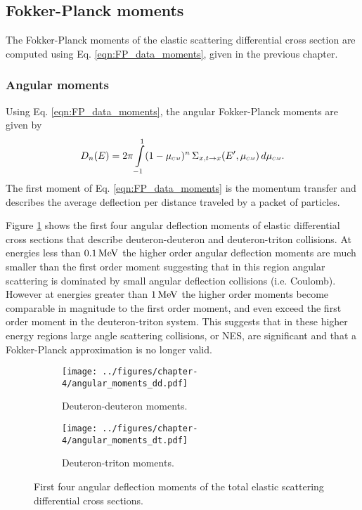 \subsection{Fokker-Planck moments}
The Fokker-Planck moments of the elastic scattering differential cross section are computed using Eq. \eqref{eqn:FP_data_moments}, given in the previous chapter. 

\subsubsection{Angular moments}
Using Eq. \eqref{eqn:FP_data_moments}, the angular Fokker-Planck moments are given by
\begin{equation} \label{eqn:angular-FP-moments}
  D_n(E) = 2\pi \int\limits_{-1}^{1} (1 - \mucm)^n \, \Sigma_{x,t\rightarrow x}(E^{\prime},\mucm) \, d\mucm.
\end{equation}
The first moment of Eq. \eqref{eqn:FP_data_moments} is the momentum transfer and describes the average deflection per distance traveled by a packet of particles.

Figure \ref{fig:angular-deflection-moments} shows the first four angular deflection moments of elastic differential cross sections that describe deuteron-deuteron and deuteron-triton collisions. At energies less than $0.1 \,\text{MeV}$ the higher order angular deflection moments are much smaller than the first order moment suggesting that in this region angular scattering is dominated by small angular deflection collisions (i.e. Coulomb). However at energies greater than $1 \,\text{MeV}$ the higher order moments become comparable in magnitude to the first order moment, and even exceed the first order moment in the deuteron-triton system. This suggests that in these higher energy regions large angle scattering collisions, or NES, are significant and that a Fokker-Planck approximation is no longer valid.
\begin{figure}[!htb]
  \centering
  \begin{subfigure}{.45\textwidth}
    \centering
    \texttt{[image: ../figures/chapter-4/angular\_moments\_dd.pdf]}
    \caption{Deuteron-deuteron moments.}
  \end{subfigure}%
  \begin{subfigure}{.45\textwidth}
    \centering
    \texttt{[image: ../figures/chapter-4/angular\_moments\_dt.pdf]}
    \caption{Deuteron-triton moments.}
  \end{subfigure}
  \caption{First four angular deflection moments of the total elastic scattering differential cross sections.}
  \label{fig:angular-deflection-moments}
\end{figure}

